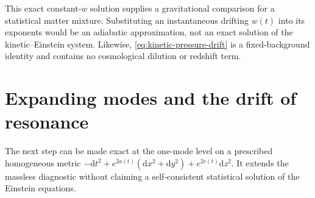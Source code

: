 \documentclass[11pt,a4paper,oneside]{book}
\theoremstyle{plain}
\theoremstyle{definition}
\theoremstyle{remark}
\newcommand{\dd}{\mathrm d}
\begin{document}
This exact constant-$w$ solution supplies a gravitational comparison for
a statistical matter mixture.  Substituting an instantaneous drifting
$w(t)$ into its exponents would be an adiabatic approximation, not an
exact solution of the kinetic--Einstein system.  Likewise,
\eqref{eq:kinetic-pressure-drift} is a fixed-background identity and
contains no cosmological dilution or redshift term.

\section{Expanding modes and the drift of resonance}
\label{sec:expanding-resonances}
The next step can be made exact at the one-mode level on a prescribed
homogeneous metric
$-\dd t^2+e^{2a(t)}(\dd x^2+\dd y^2)+e^{2c(t)}\dd z^2$.
It extends the massless diagnostic without claiming a self-consistent
statistical solution of the Einstein equations.
\end{document}
